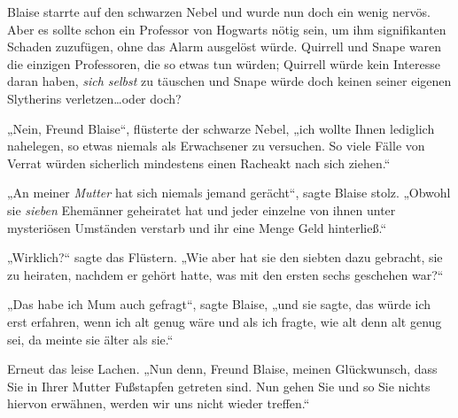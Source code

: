 Blaise starrte auf den schwarzen Nebel und wurde nun doch ein wenig nervös. Aber es sollte schon ein Professor von Hogwarts nötig sein, um ihm signifikanten Schaden zuzufügen, ohne das Alarm ausgelöst würde. Quirrell und Snape waren die einzigen Professoren, die so etwas tun würden; Quirrell würde kein Interesse daran haben, \emph{sich selbst} zu täuschen und Snape würde doch keinen seiner eigenen Slytherins verletzen…oder doch?

„Nein, Freund Blaise“, flüsterte der schwarze Nebel, „ich wollte Ihnen lediglich nahelegen, so etwas niemals als Erwachsener zu versuchen. So viele Fälle von Verrat würden sicherlich mindestens einen Racheakt nach sich ziehen.“

„An meiner \emph{Mutter} hat sich niemals jemand gerächt“, sagte Blaise stolz. „Obwohl sie \emph{sieben} Ehemänner geheiratet hat und jeder einzelne von ihnen unter mysteriösen Umständen verstarb und ihr eine Menge Geld hinterließ.“

„Wirklich?“ sagte das Flüstern. „Wie aber hat sie den siebten dazu gebracht, sie zu heiraten, nachdem er gehört hatte, was mit den ersten sechs geschehen war?“

„Das habe ich Mum auch gefragt“, sagte Blaise, „und sie sagte, das würde ich erst erfahren, wenn ich alt genug wäre und als ich fragte, wie alt denn alt genug sei, da meinte sie älter als sie.“

Erneut das leise Lachen. „Nun denn, Freund Blaise, meinen Glückwunsch, dass Sie in Ihrer Mutter Fußstapfen getreten sind. Nun gehen Sie und so Sie nichts hiervon erwähnen, werden wir uns nicht wieder treffen.“

